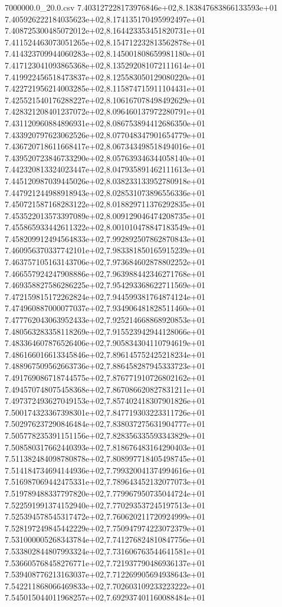 \begin{filecontents*}{7000000.0_20.0.csv}
7.403127228173976846e+02,8.183847683866133593e+01
7.405926222184035623e+02,8.174135170495992497e+01
7.408725300485072012e+02,8.164423353451820731e+01
7.411524463073051265e+02,8.154712232813562878e+01
7.414323709944060283e+02,8.145001808659981180e+01
7.417123041093865368e+02,8.135292081072111614e+01
7.419922456518473837e+02,8.125583050129080220e+01
7.422721956214003285e+02,8.115874715911104431e+01
7.425521540176288227e+02,8.106167078498492629e+01
7.428321208401237072e+02,8.096460137972280791e+01
7.431120960884896931e+02,8.086753894412686350e+01
7.433920797623062526e+02,8.077048347901654779e+01
7.436720718611668417e+02,8.067343498518494016e+01
7.439520723846733290e+02,8.057639346344058140e+01
7.442320813324023447e+02,8.047935891462111613e+01
7.445120987039445026e+02,8.038233133952780918e+01
7.447921244988918943e+02,8.028531073896556336e+01
7.450721587168283122e+02,8.018829711376292835e+01
7.453522013573397089e+02,8.009129046474208735e+01
7.455865933442611322e+02,8.001010478847183549e+01
7.458209912494564833e+02,7.992892507862870843e+01
7.460956370337742101e+02,7.983381850165915239e+01
7.463757105163143706e+02,7.973684602878802252e+01
7.466557924247908886e+02,7.963988442346271768e+01
7.469358827586286225e+02,7.954293368622711569e+01
7.472159815172262824e+02,7.944599381764874124e+01
7.474960887000077037e+02,7.934906481828511460e+01
7.477762043063952433e+02,7.925214668868920853e+01
7.480563283358118269e+02,7.915523942944128066e+01
7.483364607876526406e+02,7.905834304110794619e+01
7.486166016613345846e+02,7.896145752425218234e+01
7.488967509562663736e+02,7.886458287945333723e+01
7.491769086718744575e+02,7.876771910726802162e+01
7.494570748075458368e+02,7.867086620827831211e+01
7.497372493627049153e+02,7.857402418307901826e+01
7.500174323367398301e+02,7.847719303223311726e+01
7.502976237290846484e+02,7.838037275631904777e+01
7.505778235391151156e+02,7.828356335593343829e+01
7.508580317662440393e+02,7.818676483164290403e+01
7.511382484098780878e+02,7.808997718405498745e+01
7.514184734694144936e+02,7.799320041374994616e+01
7.516987069442475331e+02,7.789643452132077073e+01
7.519789488337797820e+02,7.779967950735044724e+01
7.522591991374152940e+02,7.770293537245197513e+01
7.525394578545317472e+02,7.760620211720924999e+01
7.528197249845442229e+02,7.750947974223072379e+01
7.531000005268343784e+02,7.741276824810847756e+01
7.533802844807993324e+02,7.731606763544641581e+01
7.536605768458276771e+02,7.721937790486936137e+01
7.539408776213163037e+02,7.712269905694938643e+01
7.542211868066469833e+02,7.702603109233223222e+01
7.545015044011968257e+02,7.692937401160088484e+01

\end{filecontents*}
